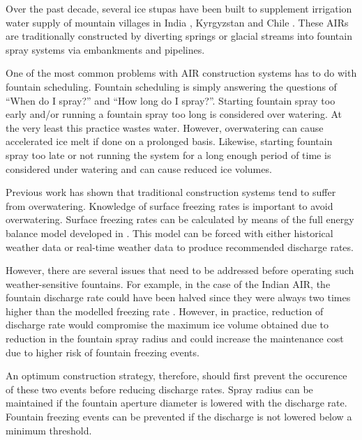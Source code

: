 \documentclass[tc, manuscript]{copernicus}
\begin{document}
Over the past decade, several ice stupas have been built to supplement irrigation water supply of mountain
villages in India \citep{wangchukIceStupaCompetition2020, palmerStoringFrozenWater2022,
aggarwalAdaptationClimateChange2021}, Kyrgyzstan \citep{bbcnewsBrightArtificialGlacier2020} and Chile
\citep{reutersConservationistsChileAim2021}. These AIRs are traditionally constructed by diverting springs or
glacial streams into fountain spray systems via embankments and pipelines. 

One of the most common problems with AIR construction systems has to do with fountain scheduling. Fountain
scheduling is simply answering the questions of “When do I spray?” and “How long do I spray?”. Starting fountain
spray too early and/or running a fountain spray too long is considered over watering. At the very least this
practice wastes water. However, overwatering can cause accelerated ice melt if done on a prolonged basis.
Likewise, starting fountain spray too late or not running the system for a long enough period of time is
considered under watering and can cause reduced ice volumes.

Previous work \citep{balasubramanianInfluenceMeteorologicalConditions2022} has shown that traditional
construction systems tend to suffer from overwatering. Knowledge of surface freezing rates is important to
avoid overwatering. Surface freezing rates can be calculated by means of the full energy balance model
developed in \cite{balasubramanianInfluenceMeteorologicalConditions2022}. This model can be forced with either
historical weather data or real-time weather data to produce recommended discharge rates.

However, there are several issues that need to be addressed before operating such weather-sensitive fountains.
For example, in the case of the Indian AIR, the fountain discharge rate could have been halved since they were
always two times higher than the modelled freezing rate
\citep{balasubramanianInfluenceMeteorologicalConditions2022}. However, in practice, reduction of discharge rate
would compromise the maximum ice volume obtained due to reduction in the fountain spray radius and could
increase the maintenance cost due to higher risk of fountain freezing events.  

An optimum construction strategy, therefore, should first prevent the occurence of these two events before
reducing discharge rates. Spray radius can be maintained if the fountain aperture diameter is lowered with the
discharge rate. Fountain freezing events can be prevented if the discharge is not lowered below a minimum
threshold. 
\end{document}
